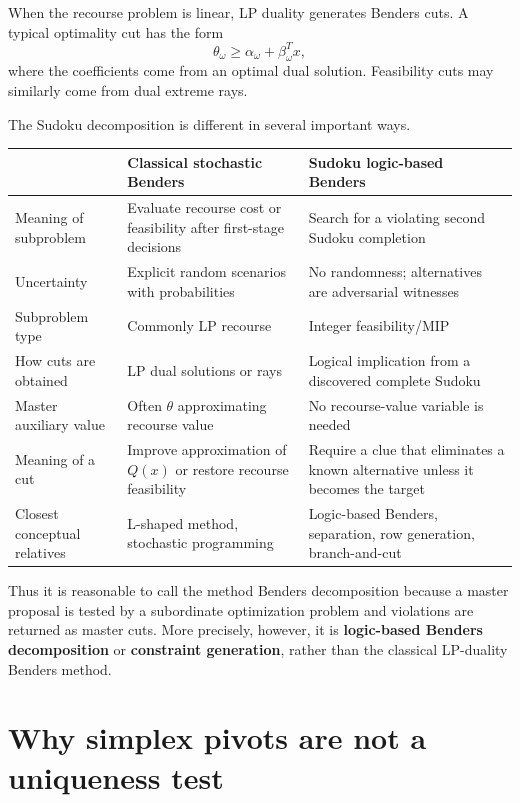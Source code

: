 \documentclass[11pt]{article}
\begin{document}
When the recourse problem is linear, LP duality generates Benders cuts. A typical optimality cut has the form
\[
\theta_\omega \ge \alpha_\omega + \beta_\omega^T x,
\]
where the coefficients come from an optimal dual solution. Feasibility cuts may similarly come from dual extreme rays.

The Sudoku decomposition is different in several important ways.

\begin{center}
\renewcommand{\arraystretch}{1.25}
\begin{tabular}{p{}p{}p{}}
\toprule
 & \textbf{Classical stochastic Benders} & \textbf{Sudoku logic-based Benders}\\
\midrule
Meaning of subproblem & Evaluate recourse cost or feasibility after first-stage decisions & Search for a violating second Sudoku completion\\
Uncertainty & Explicit random scenarios with probabilities & No randomness; alternatives are adversarial witnesses\\
Subproblem type & Commonly LP recourse & Integer feasibility/MIP\\
How cuts are obtained & LP dual solutions or rays & Logical implication from a discovered complete Sudoku\\
Master auxiliary value & Often $\theta$ approximating recourse value & No recourse-value variable is needed\\
Meaning of a cut & Improve approximation of $Q(x)$ or restore recourse feasibility & Require a clue that eliminates a known alternative unless it becomes the target\\
Closest conceptual relatives & L-shaped method, stochastic programming & Logic-based Benders, separation, row generation, branch-and-cut\\
\bottomrule
\end{tabular}
\end{center}

Thus it is reasonable to call the method Benders decomposition because a master proposal is tested by a subordinate optimization problem and violations are returned as master cuts. More precisely, however, it is \textbf{logic-based Benders decomposition} or \textbf{constraint generation}, rather than the classical LP-duality Benders method.

\section{Why simplex pivots are not a uniqueness test}
\label{sec:simplex}
\end{document}
